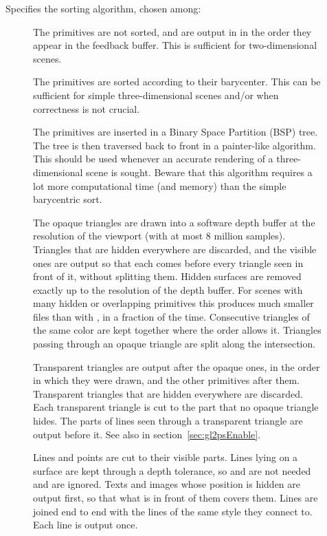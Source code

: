 \begin{description}
\item[] Specifies the sorting algorithm, chosen among:

\begin{description}
\item[] The primitives are not sorted, and are output in
   in the order they appear in the feedback buffer. This is
  sufficient for two-dimensional scenes.
\item[] The primitives are sorted according to their
  barycenter. This can be sufficient for simple three-dimensional scenes
  and/or when correctness is not crucial.
\item[] The primitives are inserted in a Binary Space
  Partition (BSP) tree. The tree is then traversed back to front in a
  painter-like algorithm. This should be used whenever an accurate rendering
  of a three-dimensional scene is sought. Beware that this algorithm
  requires a lot more computational time (and memory) than the simple
  barycentric sort.
\item[] The opaque triangles are drawn into a
  software depth buffer at the resolution of the viewport (with at most 8
  million samples).
  Triangles that are hidden everywhere are discarded, and the visible ones
  are output so that each comes before every triangle seen in front of it,
  without splitting them.
  Hidden surfaces are removed exactly up to the resolution of the depth
  buffer.
  For scenes with many hidden or overlapping primitives this produces much
  smaller files than  with , in
  a fraction of the time.
  Consecutive triangles of the same color are kept together where the order
  allows it.
  Triangles passing through an opaque triangle are split along the
  intersection.

  Transparent triangles are output after the opaque ones, in the order in
  which they were drawn, and the other primitives after them.
  Transparent triangles that are hidden everywhere are discarded.
  Each transparent triangle is cut to the part that no opaque triangle hides.
  The parts of lines seen through a transparent triangle are output before it.
  See also  in section~\ref{sec:gl2psEnable}.

  Lines and points are cut to their visible parts.
  Lines lying on a surface are kept through a depth tolerance, so
   and  are not
  needed and are ignored.
  Texts and images whose position is hidden are output first, so that what is
  in front of them covers them.
  Lines are joined end to end with the lines of the same style they connect
  to.
  Each line is output once.
\end{description}


\end{description}
